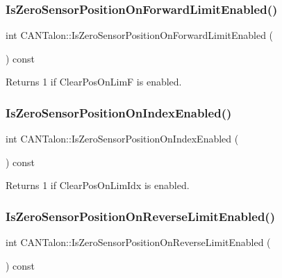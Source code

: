 \subsubsection{\texorpdfstring{Is\+Zero\+Sensor\+Position\+On\+Forward\+Limit\+Enabled()}{IsZeroSensorPositionOnForwardLimitEnabled()}}
{\footnotesize\ttfamily int C\+A\+N\+Talon\+::\+Is\+Zero\+Sensor\+Position\+On\+Forward\+Limit\+Enabled (\begin{DoxyParamCaption}{ }\end{DoxyParamCaption}) const}

\begin{DoxyReturn}{Returns}
\textquotesingle{}1\textquotesingle{} if Clear\+Pos\+On\+LimF is enabled. 
\end{DoxyReturn}
\mbox{\label{class_c_a_n_talon_a6408b0db20903b98d7e27082fc5df59e}} 
\subsubsection{\texorpdfstring{Is\+Zero\+Sensor\+Position\+On\+Index\+Enabled()}{IsZeroSensorPositionOnIndexEnabled()}}
{\footnotesize\ttfamily int C\+A\+N\+Talon\+::\+Is\+Zero\+Sensor\+Position\+On\+Index\+Enabled (\begin{DoxyParamCaption}{ }\end{DoxyParamCaption}) const}

\begin{DoxyReturn}{Returns}
\textquotesingle{}1\textquotesingle{} if Clear\+Pos\+On\+Lim\+Idx is enabled. 
\end{DoxyReturn}
\mbox{\label{class_c_a_n_talon_ab6d2a2143d143984be5ad72e6bf49e00}} 
\subsubsection{\texorpdfstring{Is\+Zero\+Sensor\+Position\+On\+Reverse\+Limit\+Enabled()}{IsZeroSensorPositionOnReverseLimitEnabled()}}
{\footnotesize\ttfamily int C\+A\+N\+Talon\+::\+Is\+Zero\+Sensor\+Position\+On\+Reverse\+Limit\+Enabled (\begin{DoxyParamCaption}{ }\end{DoxyParamCaption}) const}

